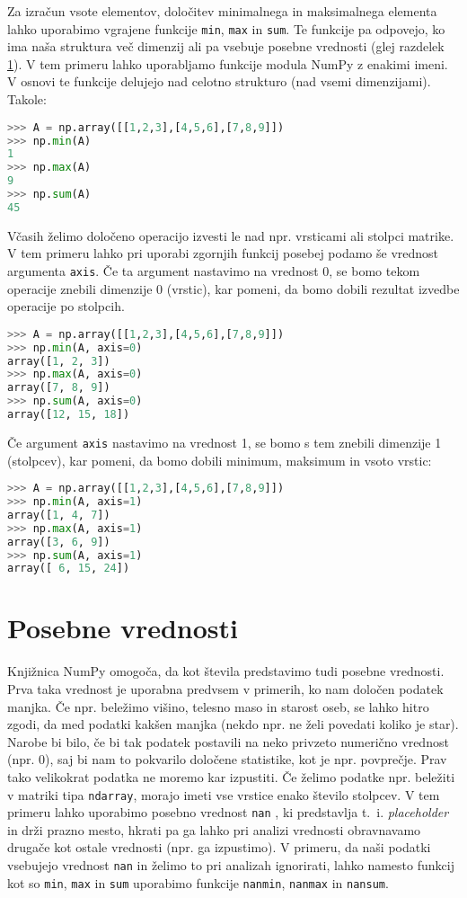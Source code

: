 Za izračun vsote elementov, določitev minimalnega in maksimalnega elementa lahko uporabimo vgrajene funkcije \texttt{min}, \texttt{max} in \texttt{sum}. Te funkcije pa odpovejo, ko ima naša struktura več dimenzij ali pa vsebuje posebne vrednosti (glej razdelek \ref{sec:np_nan}). V tem primeru lahko uporabljamo funkcije modula NumPy z enakimi imeni. V osnovi te funkcije delujejo nad celotno strukturo (nad vsemi dimenzijami). Takole:
\begin{lstlisting}[language=Python]
>>> A = np.array([[1,2,3],[4,5,6],[7,8,9]])
>>> np.min(A)
1
>>> np.max(A)
9
>>> np.sum(A)
45
\end{lstlisting}
Včasih želimo določeno operacijo izvesti le nad npr. vrsticami ali stolpci matrike. V tem primeru lahko pri uporabi zgornjih funkcij posebej podamo še vrednost argumenta \texttt{axis}. Če ta argument nastavimo na vrednost 0, se bomo tekom operacije znebili dimenzije 0 (vrstic), kar pomeni, da bomo dobili rezultat izvedbe operacije po stolpcih. %
\begin{lstlisting}[language=Python]
>>> A = np.array([[1,2,3],[4,5,6],[7,8,9]])
>>> np.min(A, axis=0)
array([1, 2, 3])
>>> np.max(A, axis=0)
array([7, 8, 9])
>>> np.sum(A, axis=0)
array([12, 15, 18])
\end{lstlisting}
Če argument \texttt{axis} nastavimo na vrednost 1, se bomo s tem znebili dimenzije 1 (stolpcev), kar pomeni, da bomo dobili minimum, maksimum in vsoto vrstic:%
\begin{lstlisting}[language=Python]
>>> A = np.array([[1,2,3],[4,5,6],[7,8,9]])
>>> np.min(A, axis=1)
array([1, 4, 7])
>>> np.max(A, axis=1)
array([3, 6, 9])
>>> np.sum(A, axis=1)
array([ 6, 15, 24])
\end{lstlisting}

\section{Posebne vrednosti}
\label{sec:np_nan}

Knjižnica NumPy omogoča, da kot števila predstavimo tudi posebne vrednosti. Prva taka vrednost je uporabna predvsem v primerih, ko nam določen podatek manjka. Če npr. beležimo višino, telesno maso in starost oseb, se lahko hitro zgodi, da med podatki kakšen manjka (nekdo npr. ne želi povedati koliko je star). Narobe bi bilo, če bi tak podatek postavili na neko privzeto numerično vrednost (npr. 0), saj bi nam to pokvarilo določene statistike, kot je npr. povprečje. Prav tako velikokrat podatka ne moremo kar izpustiti. Če želimo podatke npr. beležiti v matriki tipa \texttt{ndarray}, morajo imeti vse vrstice enako število stolpcev. V tem primeru lahko uporabimo posebno vrednost \texttt{nan} , ki predstavlja t.~i. \emph{placeholder} in drži prazno mesto, hkrati pa ga lahko pri analizi vrednosti obravnavamo drugače kot ostale vrednosti (npr. ga izpustimo). V primeru, da naši podatki vsebujejo vrednost \texttt{nan} in želimo to pri analizah ignorirati, lahko namesto funkcij kot so \texttt{min}, \texttt{max} in \texttt{sum} uporabimo funkcije \texttt{nanmin}, \texttt{nanmax} in \texttt{nansum}.

